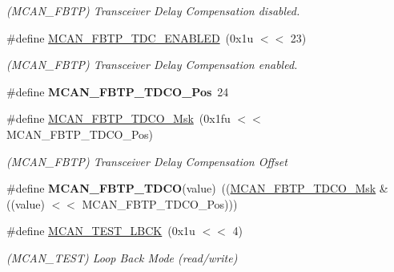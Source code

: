 \begin{DoxyCompactItemize}
\begin{DoxyCompactList}\small\item\em (M\+C\+A\+N\+\_\+\+F\+B\+TP) Transceiver Delay Compensation disabled. \end{DoxyCompactList}\item 
\mbox{\label{group__SAME70__MCAN_gaa189460e16ae7f37380a5e7f1455a223}} 
\#define \mbox{\hyperlink{group__SAME70__MCAN_gaa189460e16ae7f37380a5e7f1455a223}{M\+C\+A\+N\+\_\+\+F\+B\+T\+P\+\_\+\+T\+D\+C\+\_\+\+E\+N\+A\+B\+L\+ED}}~(0x1u $<$$<$ 23)
\begin{DoxyCompactList}\small\item\em (M\+C\+A\+N\+\_\+\+F\+B\+TP) Transceiver Delay Compensation enabled. \end{DoxyCompactList}\item 
\mbox{\label{group__SAME70__MCAN_ga44e179ba4f4fb9baad9bbe0d1162b578}} 
\#define {\bfseries M\+C\+A\+N\+\_\+\+F\+B\+T\+P\+\_\+\+T\+D\+C\+O\+\_\+\+Pos}~24
\item 
\mbox{\label{group__SAME70__MCAN_ga83334d132ecdbd836439ec4ea1d63f99}} 
\#define \mbox{\hyperlink{group__SAME70__MCAN_ga83334d132ecdbd836439ec4ea1d63f99}{M\+C\+A\+N\+\_\+\+F\+B\+T\+P\+\_\+\+T\+D\+C\+O\+\_\+\+Msk}}~(0x1fu $<$$<$ M\+C\+A\+N\+\_\+\+F\+B\+T\+P\+\_\+\+T\+D\+C\+O\+\_\+\+Pos)
\begin{DoxyCompactList}\small\item\em (M\+C\+A\+N\+\_\+\+F\+B\+TP) Transceiver Delay Compensation Offset \end{DoxyCompactList}\item 
\mbox{\label{group__SAME70__MCAN_ga1ee2ee40db9a934f209bdbe490e8db71}} 
\#define {\bfseries M\+C\+A\+N\+\_\+\+F\+B\+T\+P\+\_\+\+T\+D\+CO}(value)~((\mbox{\hyperlink{group__SAMV71__MCAN_ga83334d132ecdbd836439ec4ea1d63f99}{M\+C\+A\+N\+\_\+\+F\+B\+T\+P\+\_\+\+T\+D\+C\+O\+\_\+\+Msk}} \& ((value) $<$$<$ M\+C\+A\+N\+\_\+\+F\+B\+T\+P\+\_\+\+T\+D\+C\+O\+\_\+\+Pos)))
\item 
\mbox{\label{group__SAME70__MCAN_ga77405da2bc20a6af771b39e886367948}} 
\#define \mbox{\hyperlink{group__SAME70__MCAN_ga77405da2bc20a6af771b39e886367948}{M\+C\+A\+N\+\_\+\+T\+E\+S\+T\+\_\+\+L\+B\+CK}}~(0x1u $<$$<$ 4)
\begin{DoxyCompactList}\small\item\em (M\+C\+A\+N\+\_\+\+T\+E\+ST) Loop Back Mode (read/write) \end{DoxyCompactList}\item 

\end{DoxyCompactItemize}
